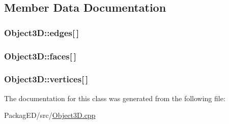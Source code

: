 \subsection{Member Data Documentation}
\subsubsection[{\texorpdfstring{edges}{edges}}]{ Object3\+D\+::edges\mbox{[}$\,$\mbox{]}}\hypertarget{class_object3_d_ad93f210748663a4d0aaa89287dee3dae}{}\label{class_object3_d_ad93f210748663a4d0aaa89287dee3dae}
\subsubsection[{\texorpdfstring{faces}{faces}}]{ Object3\+D\+::faces\mbox{[}$\,$\mbox{]}}\hypertarget{class_object3_d_a4cc7f57059a990a8573a7644a4d3ab2a}{}\label{class_object3_d_a4cc7f57059a990a8573a7644a4d3ab2a}
\subsubsection[{\texorpdfstring{vertices}{vertices}}]{ Object3\+D\+::vertices\mbox{[}$\,$\mbox{]}}\hypertarget{class_object3_d_a23cc82ea4ef0af8e0e22871bdbdba6c6}{}\label{class_object3_d_a23cc82ea4ef0af8e0e22871bdbdba6c6}


The documentation for this class was generated from the following file\+:\begin{DoxyCompactItemize}
\item 
Packag\+E\+D/src/\hyperlink{_object3_d_8cpp}{Object3\+D.\+cpp}\end{DoxyCompactItemize}
